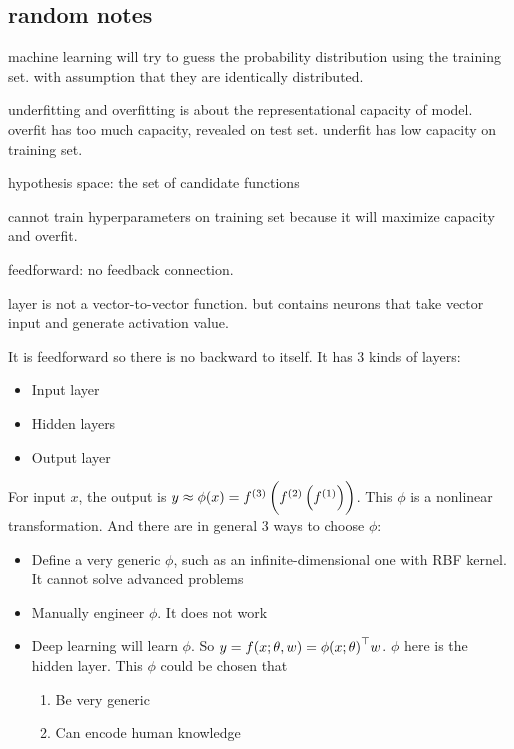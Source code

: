 \subsection{random notes}

machine learning will try to guess the probability distribution using the training set. with assumption that they are identically distributed.

underfitting and overfitting is about the representational capacity of model. overfit has too much capacity, revealed on test set. underfit has low capacity on training set.

hypothesis space: the set of candidate functions


cannot train hyperparameters on training set because it will maximize capacity and overfit.


feedforward: no feedback connection.

layer is not a vector-to-vector function. but contains neurons that take vector input and generate activation value.



It is feedforward so there is no backward to itself. It has 3 kinds of layers:
\begin{itemize}
    \item Input layer
    \item Hidden layers
    \item Output layer
\end{itemize}

For input $x$, the output is $y \approx \phi (x) = {f}^{(3)}\left( {f}^{(2)} \left({f}^{(1)} \right) \right) $. This $\phi$ is a nonlinear transformation. And there are in general 3 ways to choose $\phi$:
\begin{itemize}
    \item Define a very generic $\phi$, such as an infinite-dimensional one with RBF kernel. It cannot solve advanced problems
    \item Manually engineer $\phi$. It does not work
    \item Deep learning will learn $\phi$. So $y = f(x; \theta, w) = {\phi(x;\theta)}^\top w$. $\phi$ here is the hidden layer. This $\phi$ could be chosen that
        \begin{enumerate}
            \item Be very generic
            \item Can encode human knowledge
        \end{enumerate}
\end{itemize}



